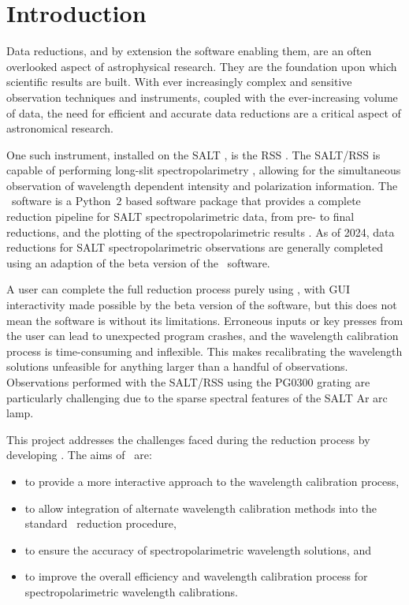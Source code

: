 \chapter{Introduction} \label{ch:01}

Data reductions, and by extension the software enabling them, are an often overlooked aspect of astrophysical research.
They are the foundation upon which scientific results are built.
With ever increasingly complex and sensitive observation techniques and instruments, coupled with the ever-increasing volume of data, the need for efficient and accurate data reductions are a critical aspect of astronomical research.

One such instrument, installed on the \gls{SALT} \citep{SALT_design}, is the \gls{RSS} \citep{SALT_optical_design}.
The \gls{SALT}/\gls{RSS} is capable of performing long-slit spectropolarimetry \citep{SALT_hires}, allowing for the simultaneous observation of wavelength dependent intensity and polarization information.
The \polsalt\ software is a Python~$2$ based software package that provides a complete reduction pipeline for \gls{SALT} spectropolarimetric data, from pre- to final reductions, and the plotting of the spectro\-polarimetric results \citep{polsalt}.
As of 2024, data reductions for \gls{SALT} spectropolarimetric observations are generally completed using an adaption of the beta version of the \polsalt\ software.

A user can complete the full reduction process purely using \polsalt, with \gls{GUI} interactivity made possible by the beta version of the software, but this does not mean the software is without its limitations.
Erroneous inputs or key presses from the user can lead to unexpected program crashes, and the wavelength calibration process is time-consuming and inflexible.
This makes recalibrating the wavelength solutions unfeasible for anything larger than a handful of observations.
Observations performed with the \gls{SALT}/\gls{RSS} using the PG$0300$ grating are particularly challenging due to the sparse spectral features of the \gls{SALT} \gls{Ar} arc lamp.

This project addresses the challenges faced during the reduction process by developing \stops.
The aims of \stops\ are:
\begin{itemize}
    \item to provide a more interactive approach to the wavelength calibration process,
    \item to allow integration of alternate wavelength calibration methods into the standard \polsalt\ reduction procedure,
    \item to ensure the accuracy of spectropolarimetric wavelength solutions, and
    \item to improve the overall efficiency and wavelength calibration process for spectropolarimetric wavelength calibrations.
\end{itemize}

